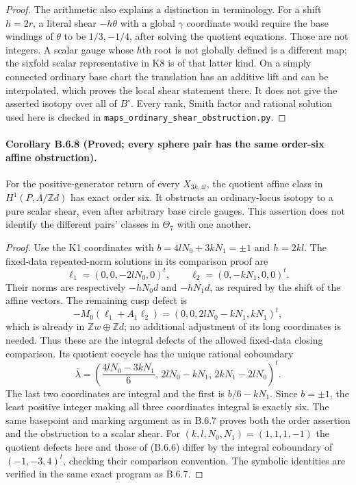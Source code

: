 \begin{proof}
The arithmetic also explains a distinction in terminology.
For a shift $h=2r$, a literal shear $-h\theta$ with a global
$\gamma$ coordinate would require the base windings of
$\theta$ to be $1/3,-1/4$, after solving the quotient
equations. Those are not integers. A scalar gauge whose
$h$th root is not globally defined is a different map; the
sixfold scalar representative in K8 is of that latter kind.
On a simply connected ordinary base chart the translation
has an additive lift and can be interpolated, which proves
the local shear statement there. It does not give the
asserted isotopy over all of $B^\circ$.
Every rank, Smith factor and rational solution used here
is checked in \texttt{maps\_ordinary\_shear\_obstruction.py}.
\end{proof}

\paragraph{Corollary B.6.8 (Proved; every sphere pair has the same order-six affine obstruction).}
For the positive-generator return of every $X_{3k,4l}$, the
quotient affine class in $H^1(P,\Lambda/\mathbb Z d)$ has exact
order six. It obstructs an ordinary-locus isotopy to a pure
scalar shear, even after arbitrary base circle gauges.
This assertion does not identify the different pairs'
classes in $\Theta_7$ with one another.

\begin{proof}
Use the K1 coordinates with $b=4lN_0+3kN_1=\pm1$ and
$h=2kl$. The fixed-data repeated-norm solutions in its
comparison proof are
\[
 \ell_1=(0,0,-2lN_0,0)^t,\qquad
 \ell_2=(0,-kN_1,0,0)^t.
\]
Their norms are respectively $-hN_0d$ and $-hN_1d$, as
required by the shift of the affine vectors. The remaining
cusp defect is
\[
 -M_0(\ell_1+A_1\ell_2)
       =(0,0,2lN_0-kN_1,kN_1)^t,
\]
which is already in $\mathbb Zw\oplus\mathbb Zd$; no
additional adjustment of its long coordinates is needed.
Thus these are the integral defects of the allowed fixed-data
closing comparison. Its quotient cocycle has the unique
rational coboundary
\[
 \bar\lambda=
 \left(\frac{4lN_0-3kN_1}{6},\,
       2lN_0-kN_1,\,2kN_1-2lN_0\right)^t.
\]
The last two coordinates are integral and the first is
$b/6-kN_1$. Since $b=\pm1$, the least positive integer
making all three coordinates integral is exactly six.
The same basepoint and marking argument as in B.6.7 proves
both the order assertion and the obstruction to a scalar
shear. For $(k,l,N_0,N_1)=(1,1,1,-1)$ the quotient defects
here and those of (B.6.6) differ by the integral coboundary
of $(-1,-3,4)^t$, checking their comparison convention.
The symbolic identities are verified in the same exact
program as B.6.7.
\end{proof}

